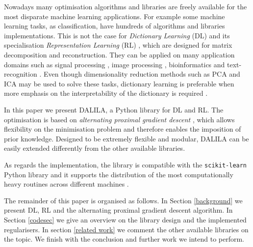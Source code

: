\documentclass[a4paper,UKenglish]{oasics-v2016}
\begin{document}
Nowadays many optimisation algorithms and libraries are freely available for the most disparate machine learning applications. For example some machine learning tasks, as classification, have hundreds of algorithms and libraries implementations. This is not the case for \emph{Dictionary Learning} (DL) \cite{lee1999learning, lin2007,  Mairal2010, mairal2009supervised,  rakotomamonjy2013direct, salzo2014alternating, tosic2011dictionary} and its specialisation \emph{Representation Learning} (RL) \cite{6472238, 4385788}, which are designed for matrix decomposition and reconstruction.
They can be applied on many application domains such as signal processing \cite{tosic2011dictionary}, image processing \cite{ravishankar2011mr}, bioinformatics \cite{alexandrov2013deciphering} and text-recognition \cite{aggarwal2012mining}. Even though dimensionality reduction methods such as PCA \cite{jolliffe2002principal} and ICA \cite{hyvarinen2004independent} may be used to solve these tasks, dictionary learning is preferable when more emphasis on the interpretability of the dictionary is required  \cite{lee1999learning}. %

In this paper we present DALILA, a Python library for DL and RL. The optimisation is based on \emph{alternating proximal gradient descent} \cite{bolte2014proximal}, which allows flexibility on the minimisation problem and therefore enables the imposition of prior knowledge.
Designed to be extremely flexible and modular, DALILA can be easily extended differently from the other available libraries.

As regards the implementation, the library is compatible with the \texttt{scikit-learn} Python library and it supports the distribution of the most computationally heavy routines across different machines \cite{dask}.%

The remainder of this paper is organised as follows. In Section \ref{background} we present DL, RL and the alternating proximal gradient descent algorithm. In Section \ref{codesec} we give an overview on the library design and the implemented regularisers. In section \ref{related work} we comment the other available libraries on the topic. We finish with the conclusion and further work we intend to perform.
\end{document}
